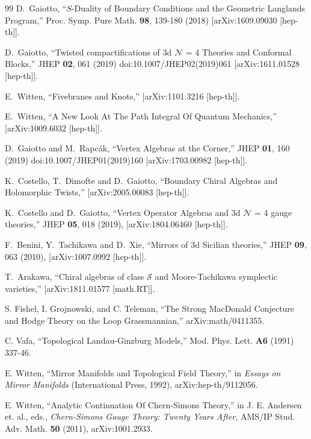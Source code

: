 \documentclass[11pt,a4paper]{article}
\begin{document}
\begin{thebibliography}{99}
D.~Gaiotto,
``$S$-Duality of Boundary Conditions and the Geometric Langlands Program,''
Proc. Symp. Pure Math. \textbf{98}, 139-180 (2018)
[arXiv:1609.09030 [hep-th]].


D.~Gaiotto,
``Twisted compactifications of 3d $ \mathcal{N} $ = 4 Theories and Conformal Blocks,''
JHEP \textbf{02}, 061 (2019)
doi:10.1007/JHEP02(2019)061
[arXiv:1611.01528 [hep-th]].


 




E.~Witten,
``Fivebranes and Knots,''
[arXiv:1101.3216 [hep-th]].

E.~Witten,
``A New Look At The Path Integral Of Quantum Mechanics,''
[arXiv:1009.6032 [hep-th]].

D.~Gaiotto and M.~Rapc\'ak,
``Vertex Algebras at the Corner,''
JHEP \textbf{01}, 160 (2019)
doi:10.1007/JHEP01(2019)160
[arXiv:1703.00982 [hep-th]].


K.~Costello, T.~Dimofte and D.~Gaiotto,
``Boundary Chiral Algebras and Holomorphic Twists,''
[arXiv:2005.00083 [hep-th]].


K.~Costello and D.~Gaiotto,
``Vertex Operator Algebras and 3d $ \mathcal{N} $ = 4 gauge theories,''
JHEP {\bf 05}, 018 (2019),
[arXiv:1804.06460 [hep-th]].


F.~Benini, Y.~Tachikawa and D.~Xie,
``Mirrors of 3d Sicilian theories,''
JHEP  {\bf 09}, 063 (2010),
[arXiv:1007.0992 [hep-th]].

T.~Arakawa,
``Chiral algebras of class $\mathcal{S}$ and Moore-Tachikawa symplectic varieties,''
[arXiv:1811.01577 [math.RT]].


S. Fishel, I. Grojnowski, and C. Teleman, ``The Strong MacDonald Conjecture and Hodge Theory on the Loop Grassmannian,'' arXiv:math/0411355.


 C. Vafa, ``Topological Landau-Ginzburg Models,'' Mod. Phys. Lett. {\bf A6} (1991) 337-46.

E. Witten, ``Mirror Manifolds and Topological Field Theory,''  in {\it Essays on Mirror Manifolds} (International Press, 1992), arXiv:hep-th/9112056.

E. Witten, ``Analytic Continuation Of Chern-Simons Theory,'' in J. E. Andersen et. al., eds., {\it Chern-Simons
Gauge Theory: Twenty Years After},  AMS/IP Stud. Adv. Math. {\bf 50} (2011), arXiv:1001.2933.


\end{thebibliography}
\end{document}
